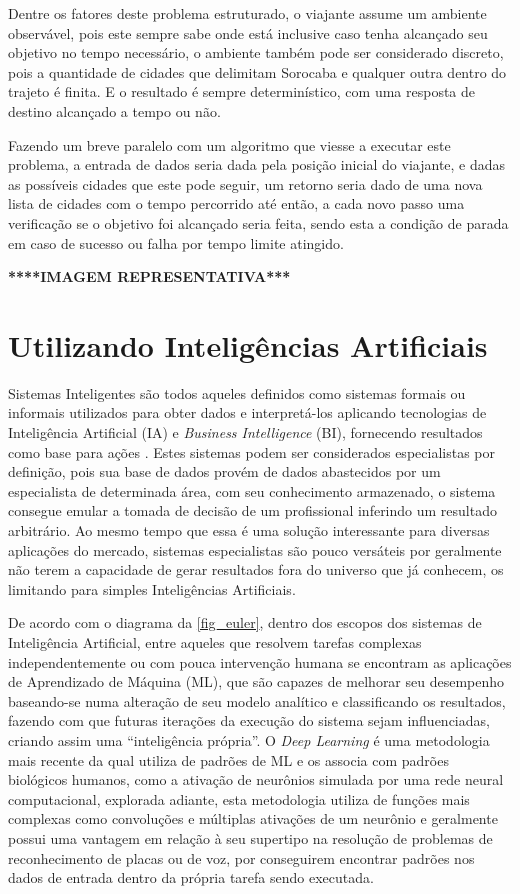 Dentre os fatores deste problema estruturado, o viajante assume um
ambiente observável, pois este sempre sabe onde está inclusive caso
tenha alcançado seu objetivo no tempo necessário, o ambiente também
pode ser considerado discreto, pois a quantidade de cidades que
delimitam Sorocaba e qualquer outra dentro do trajeto é finita. E o
resultado é sempre determinístico, com uma resposta de destino
alcançado a tempo ou não.

Fazendo um breve paralelo com um algoritmo que viesse a executar este
problema, a entrada de dados seria dada pela posição inicial do
viajante, e dadas as possíveis cidades que este pode seguir, um
retorno seria dado de uma nova lista de cidades com o tempo percorrido
até então, a cada novo passo uma verificação se o objetivo foi
alcançado seria feita, sendo esta a condição de parada em caso de
sucesso ou falha por tempo limite atingido.

\textbf{****IMAGEM REPRESENTATIVA***}

\section{Utilizando Intelig{\^e}ncias Artificiais}

Sistemas Inteligentes são todos aqueles definidos como sistemas
formais ou informais utilizados para obter dados e interpretá-los
aplicando tecnologias de Inteligência Artificial (IA) e \textit{Business
Intelligence} (BI), fornecendo resultados como base para ações
\cite{sharda2017}. Estes sistemas podem ser considerados especialistas
por definição, pois sua base de dados provém de dados abastecidos por
um especialista de determinada área, com seu conhecimento armazenado,
o sistema consegue emular a tomada de decisão de um profissional
inferindo um resultado arbitrário. Ao mesmo tempo que essa é uma
solução interessante para diversas aplicações do mercado, sistemas
especialistas são pouco versáteis por geralmente não terem a
capacidade de gerar resultados fora do universo que já conhecem, os
limitando para simples Inteligências Artificiais.

De acordo com o diagrama da \autoref{fig_euler}, dentro dos escopos
dos sistemas de Inteligência Artificial, entre aqueles que resolvem
tarefas complexas independentemente ou com pouca intervenção humana
\cite{russel2020} se encontram as aplicações de Aprendizado de Máquina
(ML), que são capazes de melhorar seu desempenho baseando-se numa
alteração de seu modelo analítico e classificando os resultados,
fazendo com que futuras iterações da execução do sistema sejam
influenciadas, criando assim uma “inteligência própria”. O \textit{Deep
Learning} é uma metodologia mais recente da qual utiliza de padrões de
ML e os associa com padrões biológicos humanos, como a ativação de
neurônios simulada por uma rede neural computacional, explorada
adiante, esta metodologia utiliza de funções mais complexas como
convoluções e múltiplas ativações de um neurônio \cite{janiesch2021} e
geralmente possui uma vantagem em relação à seu supertipo na resolução
de problemas de reconhecimento de placas ou de voz, por conseguirem
encontrar padrões nos dados de entrada dentro da própria tarefa sendo
executada.


